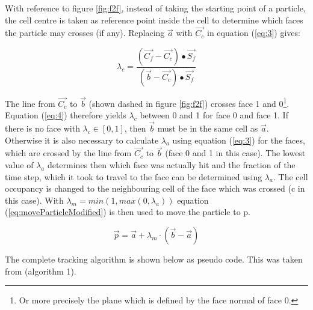 With reference to figure \ref{fig:f2f}, instead of taking the starting point of a particle, the cell centre is taken as reference point inside the cell to determine which faces the particle may crosses (if any). Replacing $\vec{a}$ with $\vec{C_c}$ in equation (\ref{eq:3}) gives:

\begin{equation}
  \label{eq:4}
  \lambda_{c} = \frac{(\vec{C_f} - \vec{C_c}) \bullet \vec{S_f}} 
                       {(\vec{b} - \vec{C_c}) \bullet \vec{S_f}}
\end{equation}

The line from $\vec{C_c}$ to $\vec{b}$ (shown dashed in figure \ref{fig:f2f}) crosses face 1 and 0\footnote{Or more precisely the plane which is defined by the face normal of face 0.}. Equation (\ref{eq:4}) therefore yields $\lambda_{c}$ between 0 and 1 for face 0 and face 1. If there is no face with  $\lambda_{c} \in [0,1]$, then $\vec{b}$ must be in the same cell as $\vec{a}$. Otherwise it is also necessary to calculate $\lambda_{a}$ using equation (\ref{eq:3}) for the faces, which are crossed by the line from $\vec{C_c}$ to $\vec{b}$ (face 0 and 1 in this case). The lowest value of $\lambda_{a}$ determines then which face was actually hit and the fraction of the time step, which it took to travel to the face can be determined using $\lambda_{a}$. The cell occupancy is changed to the neighbouring cell of the face which was crossed (c in this case). With $\lambda_m = min(1,max(0,\lambda_{a}))$ equation (\ref{eq:moveParticleModified}) is then used to move the particle to p.

\begin{equation}
	\label{eq:moveParticleModified}
	\vec{p} = \vec{a} + \lambda_m \cdot ( \vec{b} - \vec{a} )
\end{equation} 

The complete tracking algorithm is shown below as pseudo code. This was taken from \cite{macpherson08} (algorithm 1).


